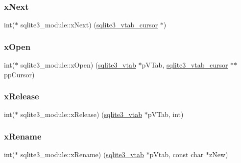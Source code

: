 \mbox{\label{structsqlite3__module_a7a95af281219212e50f3417f8c816bfc}} 
\subsubsection{\texorpdfstring{xNext}{xNext}}
{\footnotesize\ttfamily int($\ast$ sqlite3\+\_\+module\+::x\+Next) (\mbox{\hyperlink{structsqlite3__vtab__cursor}{sqlite3\+\_\+vtab\+\_\+cursor}} $\ast$)}

\mbox{\label{structsqlite3__module_a3f1e18ef5e5bd4ddbd9500c7cd951f34}} 
\subsubsection{\texorpdfstring{xOpen}{xOpen}}
{\footnotesize\ttfamily int($\ast$ sqlite3\+\_\+module\+::x\+Open) (\mbox{\hyperlink{structsqlite3__vtab}{sqlite3\+\_\+vtab}} $\ast$p\+V\+Tab, \mbox{\hyperlink{structsqlite3__vtab__cursor}{sqlite3\+\_\+vtab\+\_\+cursor}} $\ast$$\ast$pp\+Cursor)}

\mbox{\label{structsqlite3__module_ac5f0d86a3e9a26668dbf1251a7c51517}} 
\subsubsection{\texorpdfstring{xRelease}{xRelease}}
{\footnotesize\ttfamily int($\ast$ sqlite3\+\_\+module\+::x\+Release) (\mbox{\hyperlink{structsqlite3__vtab}{sqlite3\+\_\+vtab}} $\ast$p\+V\+Tab, int)}

\mbox{\label{structsqlite3__module_a684849a921202d5dec6012824c1d2308}} 
\subsubsection{\texorpdfstring{xRename}{xRename}}
{\footnotesize\ttfamily int($\ast$ sqlite3\+\_\+module\+::x\+Rename) (\mbox{\hyperlink{structsqlite3__vtab}{sqlite3\+\_\+vtab}} $\ast$p\+Vtab, const char $\ast$z\+New)}

